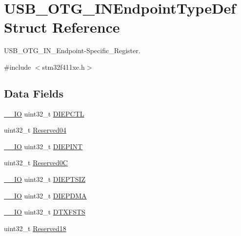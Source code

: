 \hypertarget{struct_u_s_b___o_t_g___i_n_endpoint_type_def}{}\section{U\+S\+B\+\_\+\+O\+T\+G\+\_\+\+I\+N\+Endpoint\+Type\+Def Struct Reference}
\label{struct_u_s_b___o_t_g___i_n_endpoint_type_def}


U\+S\+B\+\_\+\+O\+T\+G\+\_\+\+I\+N\+\_\+\+Endpoint-\/\+Specific\+\_\+\+Register.  




{\ttfamily \#include $<$stm32f411xe.\+h$>$}

\subsection*{Data Fields}
\begin{DoxyCompactItemize}
\item 
\hyperlink{core__sc300_8h_aec43007d9998a0a0e01faede4133d6be}{\+\_\+\+\_\+\+IO} uint32\+\_\+t \hyperlink{struct_u_s_b___o_t_g___i_n_endpoint_type_def_a7ae9a62fb2acdc8981930ceb8ba5f100}{D\+I\+E\+P\+C\+TL}
\item 
uint32\+\_\+t \hyperlink{struct_u_s_b___o_t_g___i_n_endpoint_type_def_ab40b947e437eea142bb6682282b073d6}{Reserved04}
\item 
\hyperlink{core__sc300_8h_aec43007d9998a0a0e01faede4133d6be}{\+\_\+\+\_\+\+IO} uint32\+\_\+t \hyperlink{struct_u_s_b___o_t_g___i_n_endpoint_type_def_af66b4da67fb3732d6fd4f98dd0e9f824}{D\+I\+E\+P\+I\+NT}
\item 
uint32\+\_\+t \hyperlink{struct_u_s_b___o_t_g___i_n_endpoint_type_def_a30c3ab77aa3174965375dfe1a01bdddb}{Reserved0C}
\item 
\hyperlink{core__sc300_8h_aec43007d9998a0a0e01faede4133d6be}{\+\_\+\+\_\+\+IO} uint32\+\_\+t \hyperlink{struct_u_s_b___o_t_g___i_n_endpoint_type_def_aeda9700dcd52e252d7809cabed971bab}{D\+I\+E\+P\+T\+S\+IZ}
\item 
\hyperlink{core__sc300_8h_aec43007d9998a0a0e01faede4133d6be}{\+\_\+\+\_\+\+IO} uint32\+\_\+t \hyperlink{struct_u_s_b___o_t_g___i_n_endpoint_type_def_a8a7731263a0403b02e369ca387dce8e0}{D\+I\+E\+P\+D\+MA}
\item 
\hyperlink{core__sc300_8h_aec43007d9998a0a0e01faede4133d6be}{\+\_\+\+\_\+\+IO} uint32\+\_\+t \hyperlink{struct_u_s_b___o_t_g___i_n_endpoint_type_def_a2343fef0358d8713918d26eb93f1fa8b}{D\+T\+X\+F\+S\+TS}
\item 
uint32\+\_\+t \hyperlink{struct_u_s_b___o_t_g___i_n_endpoint_type_def_a525d6997cba563967fd7ea22898ed4f6}{Reserved18}
\end{DoxyCompactItemize}


